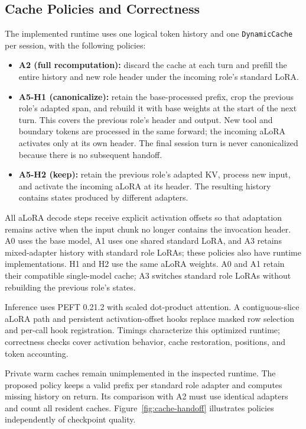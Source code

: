 \documentclass[10pt,twocolumn,letterpaper]{article}
\begin{document}
\subsection{Cache Policies and Correctness}
The implemented runtime uses one logical token history and one
\texttt{DynamicCache} per session, with the following policies:
\begin{itemize}
  \item \textbf{A2 (full recomputation):} discard the cache at each turn and
    prefill the entire history and new role header under the incoming role's
    standard LoRA.
  \item \textbf{A5-H1 (canonicalize):} retain the base-processed prefix, crop
    the previous role's adapted span, and rebuild it with base weights at
    the start of the next turn. This covers the previous role's header and
    output. New tool and boundary tokens are processed in the same forward;
    the incoming aLoRA activates only at its own header. The final session
    turn is never canonicalized because there is no subsequent handoff.
  \item \textbf{A5-H2 (keep):} retain the previous role's adapted KV, process
    new input, and activate the incoming aLoRA at its header. The resulting
    history contains states produced by different adapters.
\end{itemize}
All aLoRA decode steps receive explicit activation offsets so that adaptation
remains active when the input chunk no longer contains the invocation header.
A0 uses the base model, A1 uses one shared standard LoRA, and A3 retains
mixed-adapter history with standard role LoRAs; these policies also have
runtime implementations. H1 and H2 use the same aLoRA weights. A0 and A1
retain their compatible single-model cache; A3 switches standard role LoRAs
without rebuilding the previous role's states.

Inference uses PEFT 0.21.2 with scaled dot-product attention. A contiguous-slice
aLoRA path and persistent activation-offset hooks replace masked row selection
and per-call hook registration. Timings characterize this optimized runtime;
correctness checks cover activation behavior, cache restoration, positions,
and token accounting.

Private warm caches remain unimplemented in the inspected runtime. The
proposed policy keeps a valid prefix per standard role adapter and computes
missing history on return. Its comparison with A2 must use identical adapters
and count all resident caches. Figure~\ref{fig:cache-handoff} illustrates
policies independently of checkpoint quality.
\end{document}
